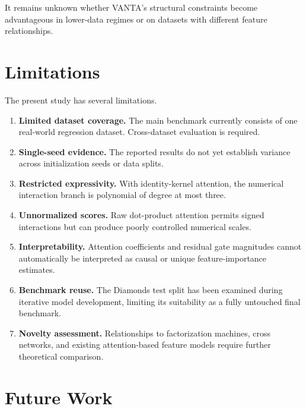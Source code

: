 \documentclass[11pt,a4paper]{article}
\begin{document}
It remains unknown whether VANTA's
structural constraints become advantageous
in lower-data regimes or on datasets
with different feature relationships.

\section{Limitations}

The present study has several limitations.

\begin{enumerate}[leftmargin=*]

\item \textbf{Limited dataset coverage.}
The main benchmark currently consists
of one real-world regression dataset.
Cross-dataset evaluation is required.

\item \textbf{Single-seed evidence.}
The reported results do not yet
establish variance across initialization
seeds or data splits.

\item \textbf{Restricted expressivity.}
With identity-kernel attention,
the numerical interaction branch
is polynomial of degree at most three.

\item \textbf{Unnormalized scores.}
Raw dot-product attention permits
signed interactions but can produce
poorly controlled numerical scales.

\item \textbf{Interpretability.}
Attention coefficients and residual
gate magnitudes cannot automatically
be interpreted as causal or unique
feature-importance estimates.

\item \textbf{Benchmark reuse.}
The Diamonds test split has been
examined during iterative model
development, limiting its suitability
as a fully untouched final benchmark.

\item \textbf{Novelty assessment.}
Relationships to factorization machines,
cross networks, and existing
attention-based feature models
require further theoretical comparison.

\end{enumerate}

\section{Future Work}
\end{document}
